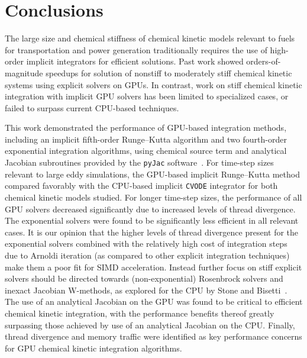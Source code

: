 \documentclass[final,twocolumn]{elsarticle}
\begin{document}
\section{Conclusions}
\label{S:conclusions}
\ifmeasure
\addvspace{10pt}
\fi

The large size and chemical stiffness of chemical kinetic models relevant to fuels for transportation and power generation traditionally requires the use of high-order implicit integrators for efficient solutions.
Past work showed orders-of-magnitude speedups for solution of nonstiff to moderately stiff chemical kinetic systems using explicit solvers on GPUs.
In contrast, work on stiff chemical kinetic integration with implicit GPU solvers has been limited to specialized cases, or failed to surpass current CPU-based techniques.

This work demonstrated the performance of GPU-based integration methods, including an implicit fifth-order Runge--Kutta algorithm and two fourth-order exponential integration algorithms, using chemical source term and analytical Jacobian subroutines provided by the \texttt{pyJac} software~\cite{niemeyer_2016_51139,Niemeyer:2015ws,2016arXiv160503262N}.
For time-step sizes relevant to large eddy simulations, the GPU-based implicit Runge--Kutta method compared favorably with the CPU-based implicit \texttt{CVODE} integrator for both chemical kinetic models studied.
For longer time-step sizes, the performance of all GPU solvers decreased significantly due to increased levels of thread divergence.
The exponential solvers were found to be significantly less efficient in all relevant cases.
It is our opinion that the higher levels of thread divergence present for the exponential solvers combined with the relatively high cost of integration steps due to Arnoldi iteration (as compared to other explicit integration techniques) make them a poor fit for SIMD acceleration.
Instead further focus on stiff explicit solvers should be directed towards (non-exponential) Rosenbrock solvers and inexact Jacobian W-methods, as explored for the CPU by Stone and Bisetti~\cite{stone2014comparison}.
The use of an analytical Jacobian on the GPU was found to be critical to efficient chemical kinetic integration, with the performance benefits thereof greatly surpassing those achieved by use of an analytical Jacobian on the CPU.
Finally, thread divergence and memory traffic were identified as key performance concerns for GPU chemical kinetic integration algorithms.
\end{document}

